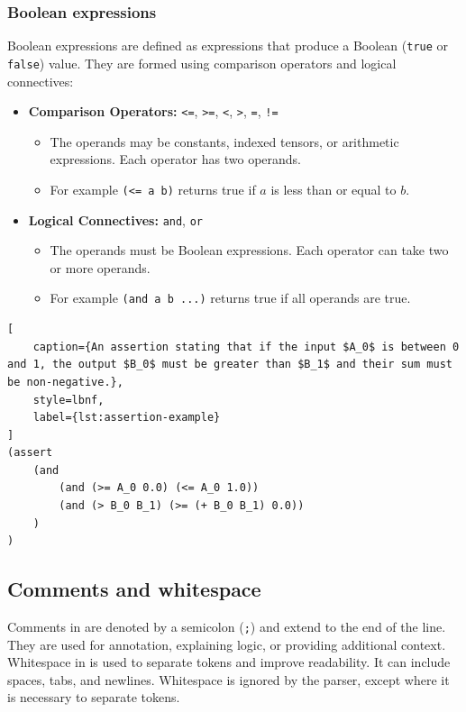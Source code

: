 \subsubsection*{Boolean expressions}
Boolean expressions are defined as expressions that produce a Boolean (\texttt{true} or \texttt{false}) value. They are formed using comparison operators and logical connectives:
\begin{itemize}
    \item \textbf{Comparison Operators:} \texttt{<=}, \texttt{>=}, \texttt{<}, \texttt{>}, \texttt{=}, \texttt{!=}
    \begin{itemize}
        \item The operands may be constants, indexed tensors, or arithmetic expressions. Each operator has two operands.
        \item For example \texttt{(<= a b)} returns true if $a$ is less than or equal to $b$.
    \end{itemize}
    \item \textbf{Logical Connectives:} \texttt{and}, \texttt{or}
    \begin{itemize}
        \item The operands must be Boolean expressions. Each operator can take two or more operands.
        \item For example \texttt{(and a b ...)} returns true if all operands are true.
    \end{itemize}
\end{itemize}

\begin{lstlisting}[
    caption={An assertion stating that if the input $A_0$ is between 0 and 1, the output $B_0$ must be greater than $B_1$ and their sum must be non-negative.},
    style=lbnf,
    label={lst:assertion-example}
]
(assert
    (and
        (and (>= A_0 0.0) (<= A_0 1.0))
        (and (> B_0 B_1) (>= (+ B_0 B_1) 0.0))
    )
)
\end{lstlisting}

\subsection{Comments and whitespace}

Comments in \vnnlib{} are denoted by a semicolon (\texttt{;}) and extend to the end of the line. They are used for annotation, explaining logic, or providing additional context. Whitespace in \vnnlib{} is used to separate tokens and improve readability. It can include spaces, tabs, and newlines. Whitespace is ignored by the parser, except where it is necessary to separate tokens.


